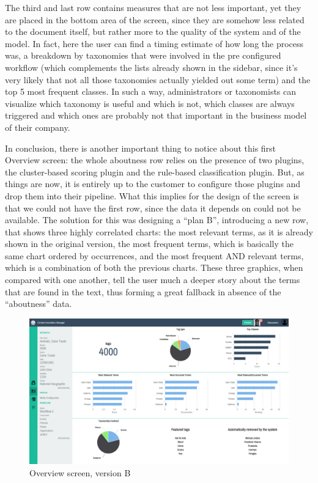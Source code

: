 \documentclass[12pt,svgnames]{memoir}
\begin{document}
The third and last row contains measures that are not less important,
yet they are placed in the bottom area of the screen, since they are
somehow less related to the document itself, but rather more to the
quality of the system and of the model. In fact, here the user can find
a timing estimate of how long the process was, a breakdown by taxonomies
that were involved in the pre configured workflow (which complements the
lists already shown in the sidebar, since it's very likely that not all
those taxonomies actually yielded out some term) and the top 5 most
frequent classes. In such a way, administrators or taxonomists can
visualize which taxonomy is useful and which is not, which classes are
always triggered and which ones are probably not that important in the
business model of their company.

In conclusion, there is another important thing to notice about this
first Overview screen: the whole aboutness row relies on the presence of
two plugins, the cluster-based scoring plugin and the rule-based
classification plugin. But, as things are now, it is entirely up to the
customer to configure those plugins and drop them into their pipeline.
What this implies for the design of the screen is that we could not have
the first row, since the data it depends on could not be available. The
solution for this was designing a ``plan B'', introducing a new row,
that shows three highly correlated charts: the most relevant terms, as
it is already shown in the original version, the most frequent terms,
which is basically the same chart ordered by occurrences, and the most
frequent AND relevant terms, which is a combination of both the previous
charts. These three graphics, when compared with one another, tell the
user much a deeper story about the terms that are found in the text,
thus forming a great fallback in absence of the ``aboutness'' data.

\begin{figure}[htbp]
\centering
\includegraphics{./src/img/overview-B.png}
\caption{Overview screen, version B}
\end{figure}
\end{document}
